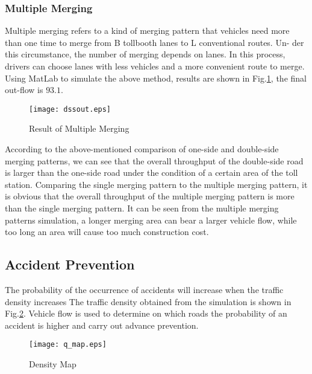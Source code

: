 \documentclass{mcmthesis}
\begin{document}
\subsubsection{Multiple Merging}
Multiple merging refers to a kind of merging pattern that vehicles need more than one time to merge from B tollbooth lanes to L conventional routes. Un-  der this circumstance, the number of merging depends on lanes. In this process, drivers can choose lanes with less vehicles and a more convenient route to merge. Using MatLab to simulate the above method, results are shown in Fig.\ref{fig:multiple_out}, the final out-flow is $93.1$.
\begin{figure}[!htbp]
	\small
	\centering
	\texttt{[image: dssout.eps]}
	\caption{\label{fig:multiple_out}Result of Multiple Merging} 
\end{figure}

According to the above-mentioned comparison of one-side and double-side merging patterns, we can see that the overall throughput of the double-side road is larger than the one-side road under the condition of a certain area of the toll station. Comparing the single merging pattern to the multiple merging pattern, it is obvious that the overall throughput of the multiple merging pattern is more than the single merging pattern. It can be seen from the multiple merging patterns simulation, a longer merging area can bear a larger vehicle flow, while too long an area will cause too much construction cost.

\subsection{Accident Prevention}

The probability of the occurrence of accidents will increase when the traffic density increases\cite{zhou1997relationship} The traffic density obtained from the simulation is shown in Fig.\ref{fig:q_map}. Vehicle flow is used to determine on which roads the probability of an accident is higher and carry out advance prevention.
\begin{figure}[!htbp]
	\small
	\centering
	\texttt{[image: q\_map.eps]}
	\caption{\label{fig:q_map}Density Map} 
\end{figure}
\end{document}
